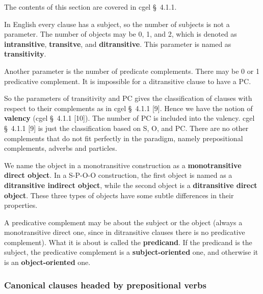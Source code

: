 \documentclass{article}
\newcommand*{\citesec}[1]{\S~{#1}}
\newcommand*{\concept}[1]{\textbf{#1}}
\begin{document}
The contents of this section are covered in \ac{cgel} \citesec{4.1.1}.


In English every clause has a subject, so the number of subjects is not a parameter.
The number of objects may be 0, 1, and 2,
which is denoted as \concept{intransitive}, \concept{transitve}, and \concept{ditransitive}.
This parameter is named as \concept{transitivity}.


Another parameter is the number of predicate complements.
There may be 0 or 1 predicative complement.
It is impossible for a ditransitive clause to have a PC.

So the parameters of transitivity and PC gives the classification 
of clauses with respect to their complements 
as in \ac{cgel} \citesec{4.1.1} [9].
Hence we have the notion of \concept{valency} (\ac{cgel} \citesec{4.1.1} [10]). 
The number of PC is included into the valency.
\ac{cgel} \citesec{4.1.1} [9] is just the classification based on S, O, and PC.
There are no other complements that do not fit perfectly in the paradigm,
namely prepositional complements, adverbs and particles.

We name the object in a monotransitive construction as a \concept{monotransitive direct object}.
In a S-P-O-O construction, 
the first object is named as a \concept{ditransitive indirect object},
while the second object is a \concept{ditransitive direct object}.
These three types of objects have some subtle differences in their properties. %

A predicative complement may be about the subject or the object 
(always a monotransitive direct one, since in ditransitive clauses there is no predicative complement).
What it is about is called the \concept{predicand}.
If the predicand is the subject, the predicative complement is a \concept{subject-oriented} one,
and otherwise it is an \concept{object-oriented} one.

\subsubsection{Canonical clauses headed by prepositional verbs}
\end{document}
